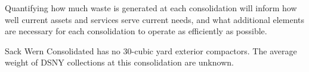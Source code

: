 
    Quantifying how much waste is generated at each consolidation will inform how well current assets and services serve current needs, and what additional elements are necessary for each consolidation to operate as efficiently as possible.
    
    Sack Wern Consolidated has no 30-cubic yard exterior compactors. The average weight of DSNY collections at this consolidation are unknown.